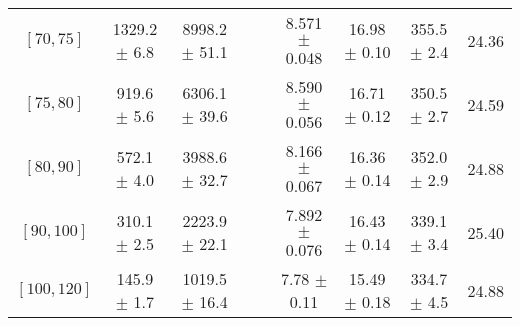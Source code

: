 \begin{tabular}{c||c|c|c|c|c|c|c||c}
$[70, 75]$ & 1329.2 $\pm$ 6.8 & 8998.2 $\pm$ 51.1 &  &  & 8.571 $\pm$ 0.048 & 16.98 $\pm$ 0.10 & 355.5 $\pm$ 2.4 & 24.36\\
$[75, 80]$ & 919.6 $\pm$ 5.6 & 6306.1 $\pm$ 39.6 &  &  & 8.590 $\pm$ 0.056 & 16.71 $\pm$ 0.12 & 350.5 $\pm$ 2.7 & 24.59\\
$[80, 90]$ & 572.1 $\pm$ 4.0 & 3988.6 $\pm$ 32.7 &  &  & 8.166 $\pm$ 0.067 & 16.36 $\pm$ 0.14 & 352.0 $\pm$ 2.9 & 24.88\\
$[90, 100]$ & 310.1 $\pm$ 2.5 & 2223.9 $\pm$ 22.1 &  &  & 7.892 $\pm$ 0.076 & 16.43 $\pm$ 0.14 & 339.1 $\pm$ 3.4 & 25.40\\
$[100, 120]$ & 145.9 $\pm$ 1.7 & 1019.5 $\pm$ 16.4 &  &  & 7.78 $\pm$ 0.11 & 15.49 $\pm$ 0.18 & 334.7 $\pm$ 4.5 & 24.88\\
\end{tabular}
